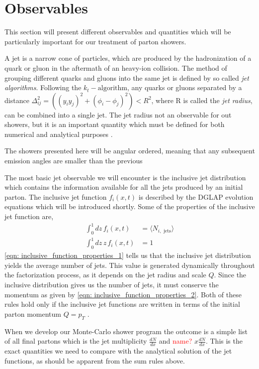 \documentclass[main.tex]{subfiles}
\begin{document}
\section{Observables}
This section will present different observables and quantities which will be particularly important for our treatment of parton showers.

A jet is a narrow cone of particles, which are produced by the hadronization of a quark or gluon in the aftermath of an heavy-ion collision. The method of grouping different quarks and gluons into the same jet is defined by so called \textit{jet algorithms}. Following the \(k_t-\text{algorithm}\), any quarks or gluons separated by a distance \(\Delta_{ij}^2 = ((y_iy_j)^2+(\phi_i-\phi_j)^2) < R^2\), where R is called the \textit{jet radius}, can be combined into a single jet. The jet radius not an observable for out showers, but it is an important quantity which must be defined for both numerical and analytical purposes \cite{Dasgupta_2015}. 

The showers presented here will be angular ordered, meaning that any subsequent emission angles are smaller than the previous 

The most basic jet observable we will encounter is the inclusive jet distribution which contains the information available for all the jets produced by an initial parton. The inclusive jet function \(f_i(x,t)\) is described by the DGLAP evolution equations which will be introduced shortly. Some of the properties of the inclusive jet function are, 
\begin{align}
    \int_0^1 dz\, f_i(x,t) &= \langle N_{i, \text{ jets}}\rangle  \label{eqn: inclusive_function_properties_1}\\
    \int_0^1 dz\, z\,  f_i(x,t) &= 1 \label{eqn: inclusive_function_properties_2}
\end{align}
\autoref{eqn: inclusive_function_properties_1} tells us that the inclusive jet distribution yields the average number of jets. This value is generated dynamically throughout the factorization process, as it depends on the jet radius and scale \(Q\). Since the inclusive distribution gives us the number of jets, it must conserve the momentum as given by \autoref{eqn: inclusive_function_properties_2}. Both of these rules hold only if the inclusive jet functions are written in terms of the initial parton momentum \(Q=p_T\) \cite{Neill_2021}.

When we develop our Monte-Carlo shower program the outcome is a simple list of all final partons which is the jet multiplicity \(\frac{dN}{dx}\) and \textcolor{red}{name?} \(x \frac{dN}{dx}\). This is the exact quantities we need to compare with the analytical solution of the jet functions, as should be apparent from the sum rules above.
\end{document}
